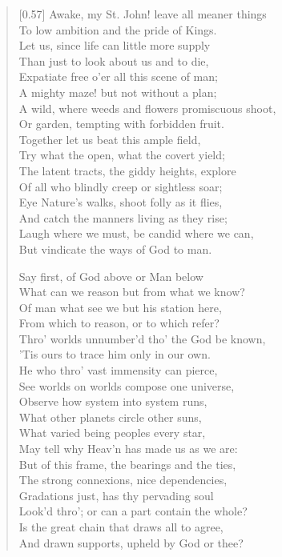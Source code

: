 \begin{verse}[0.57\textwidth]\normalsize
Awake, my St. John! leave all meaner things\\
To low ambition and the pride of Kings.\\
Let us, since life can little more supply\\
Than just to look about us and to die,\\
Expatiate free o'er all this scene of man;\\
A mighty maze! but not without a plan;\\
A wild, where weeds and flowers promiscuous shoot,\\
Or garden, tempting with forbidden fruit.\\
Together let us beat this ample field,\\
Try what the open, what the covert yield;\\
The latent tracts, the giddy heights, explore\\
Of all who blindly creep or sightless soar;\\
Eye Nature's walks, shoot folly as it flies,\\
And catch the manners living as they rise;\\
Laugh where we must, be candid where we can,\\
But vindicate the ways of God to man.

Say first, of God above or Man below\\
What can we reason but from what we know?\\
Of man what see we but his station here,\\
From which to reason, or to which refer?\\
Thro' worlds unnumber'd tho' the God be known,\\
'Tis ours to trace him only in our own.\\
He who thro' vast immensity can pierce,\\
See worlds on worlds compose one universe,\\
Observe how system into system runs,\\
What other planets circle other suns,\\
What varied being peoples every star,\\
May tell why Heav'n has made us as we are:\\
But of this frame, the bearings and the ties,\\
The strong connexions, nice dependencies,\\
Gradations just, has thy pervading soul\\
Look'd thro'; or can a part contain the whole?\\
\vin Is the great chain that draws all to agree,\\
And drawn supports, upheld by God or thee?


\end{verse}
